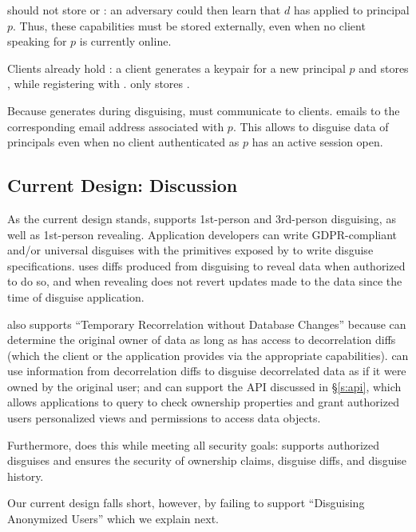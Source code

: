 \sys should not store  or : an adversary could then learn that $d$ has applied to
principal $p$. Thus, these capabilities must be stored externally, even when no client speaking for
$p$ is currently online.
%
%

Clients already hold : a client generates a keypair for a new principal $p$ and stores
, while registering  with \sys. \sys only stores .

Because \sys generates  during disguising, \sys must communicate  to clients.
\sys emails  to the corresponding email address associated with $p$.  This allows \sys to
disguise data of principals even when no client authenticated as $p$ has an active session open.

\subsection{Current Design: Discussion}
As the current design stands, \sys supports 1st-person and 3rd-person disguising, as well as
1st-person revealing.
%
Application developers can write GDPR-compliant and/or universal disguises with the primitives
exposed by \sys to write disguise specifications.
%
\sys uses diffs produced from disguising to reveal data when authorized to do so, and when
revealing does not revert updates made to the data since the time of disguise application.

%
\sys also supports ``Temporary Recorrelation without Database Changes'' because \sys can determine
the original owner of data as long as \sys has access to decorrelation diffs (which the client or
the application provides via the appropriate capabilities).
%
\sys can use information from decorrelation diffs to disguise decorrelated data as if it were owned
by the original user; and 
%
\sys can support the API discussed in \S\ref{s:api}, which allows applications to query \sys to
check ownership properties and grant authorized users personalized views and permissions to access
data objects.

Furthermore, \sys does this while meeting all security goals: \sys supports authorized disguises and
ensures the security of ownership claims, disguise diffs, and disguise history.

Our current design falls short, however, by failing to support ``Disguising Anonymized
Users'' which we explain next.
